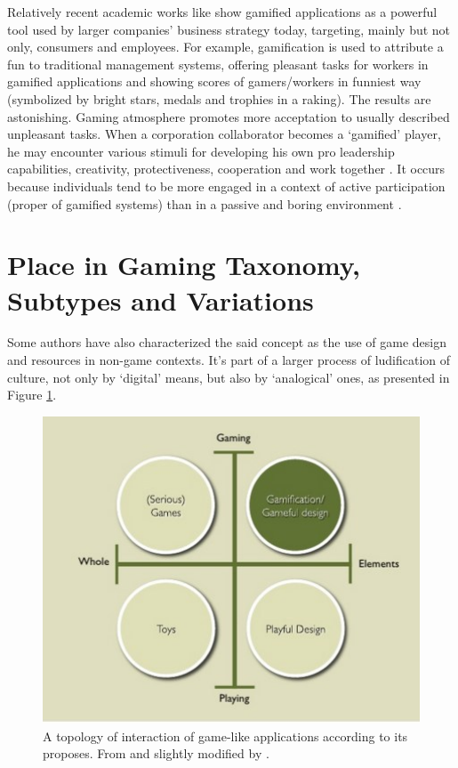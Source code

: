 Relatively recent academic works like \citep{Gartner} show gamified applications as a powerful tool used by larger companies' business strategy today, targeting, mainly but not only, consumers and employees. For example, gamification is used to attribute a fun to traditional management systems, offering pleasant tasks for workers in gamified applications and showing scores of gamers/workers in funniest way (symbolized by bright stars, medals and trophies in a raking). The results are astonishing. Gaming atmosphere promotes more acceptation to usually described unpleasant tasks. When a corporation collaborator becomes a `gamified' player, he may encounter various stimuli for developing his own pro leadership capabilities, creativity, protectiveness, cooperation and work together \citep{Zich}. It occurs because individuals tend to be more engaged in a context of active participation (proper of gamified systems) than in a passive and boring environment \citep{Medina}.

\section{Place in Gaming Taxonomy, Subtypes and Variations}
Some authors \citep{gameAcm} have also characterized the said concept as the use of game design and resources in non-game contexts. It's part of a larger process of ludification of culture, not only by `digital' means, but also by `analogical' ones, as presented in Figure \ref{taxonomy}.
	

\begin{figure}[h]
	\begin{center}
		\includegraphics[width=14cm]{chapters/gamification/img/gamification.jpg}
		\caption{A topology of interaction of game-like applications according to its proposes. From \citep{gameAcm} and slightly modified by \cite{gamification_image}.}
		\label{taxonomy}
	\end{center}
\end{figure}



